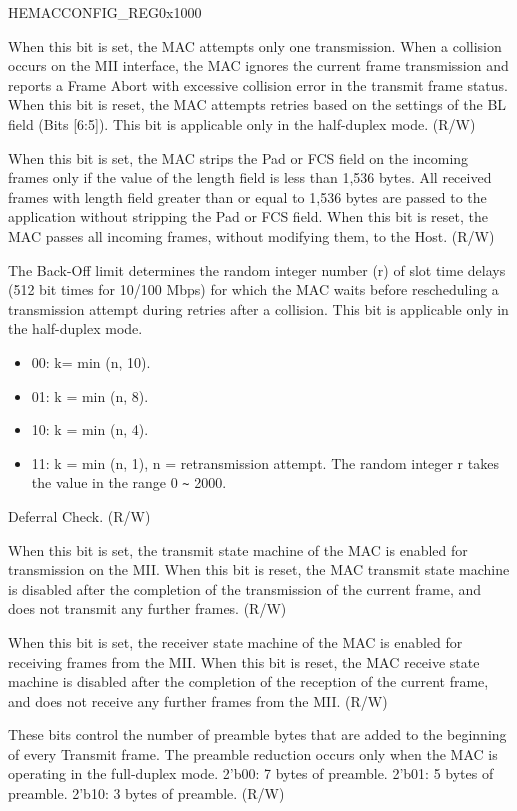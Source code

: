 \addtocounter{Regfloat}{-1}
\begin{register}{H}{EMACCONFIG\_REG}{0x1000}
\begin{regdesc}\begin{reglist}
\item [Continued from the previous page...]
\item [EMACRETRY]When this bit is set, the MAC attempts only one transmission. When a collision occurs on the MII interface, the MAC ignores the current frame transmission and reports a Frame Abort with excessive collision error in the transmit frame status. When this bit is reset, the MAC attempts retries based on the settings of the BL field (Bits [6:5]). This bit is applicable only in the half-duplex mode. (R/W)
\item [EMACPADCRCSTRIP]When this bit is set, the MAC strips the Pad or FCS field on the incoming frames only if the value of the length field is less than 1,536 bytes. All received frames with length field greater than or equal to 1,536 bytes are passed to the application  without stripping the Pad or FCS field. When this bit is reset, the MAC passes all incoming frames, without modifying them, to the Host. (R/W)

\item [EMACBACKOFFLIMIT]The Back-Off limit determines the random integer number (r) of slot time delays (512 bit times for 10/100 Mbps) for which the MAC waits before rescheduling a transmission attempt during retries after a collision. This bit is applicable only in the half-duplex mode. \begin{itemize} \item 00: k= min (n, 10). \item 01: k = min (n, 8). \item 10: k = min (n, 4). \item 11: k = min (n, 1), n = retransmission attempt. The random integer r takes the value in the range 0 \verb+~+ 2000. \end{itemize}
\item [EMACDEFERRALCHECK]Deferral Check. (R/W)
\item [EMACTX]When this bit is set, the transmit state machine of the MAC is enabled for transmission on the  MII. When this bit is reset, the MAC transmit state machine is disabled after the completion of the transmission of the current frame, and does not transmit any further frames. (R/W)
\item [EMACRX]When this bit is set, the receiver state machine of the MAC is enabled for receiving frames from the  MII. When this bit is reset, the MAC receive state machine is disabled after the completion of the reception of the current frame, and does not receive any further frames from the  MII. (R/W)
\item [PLTF]These bits control the number of preamble bytes that are added to the beginning of every Transmit frame. The preamble reduction occurs only when the MAC is operating in the full-duplex mode. 2'b00: 7 bytes of preamble. 2'b01: 5 bytes of preamble. 2'b10: 3 bytes of preamble. (R/W)
\end{reglist}\end{regdesc}
\end{register}


